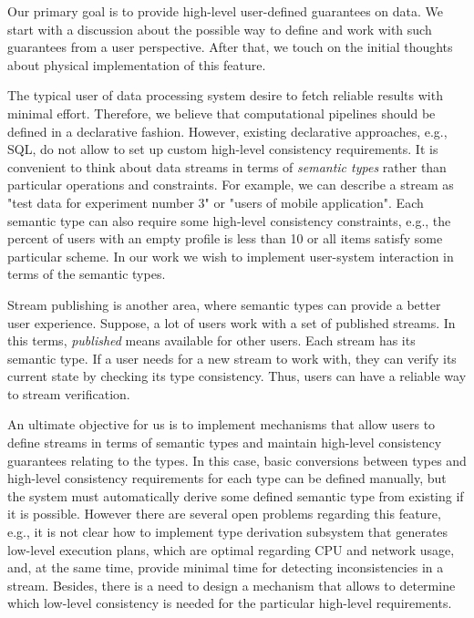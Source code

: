 \label{fs-phd-reliable}

Our primary goal is to provide high-level user-defined guarantees on data. We start with a discussion about the possible way to define and work with such guarantees from a user perspective. After that, we touch on the initial thoughts about physical implementation of this feature.

The typical user of data processing system desire to fetch reliable results with minimal effort. Therefore, we believe that computational pipelines should be defined in a declarative fashion. However, existing declarative approaches, e.g., SQL, do not allow to set up custom high-level consistency requirements. It is convenient to think about data streams in terms of {\em semantic types} rather than particular operations and constraints. For example, we can describe a stream as "test data for experiment number 3" or "users of mobile application". Each semantic type can also require some high-level consistency constraints, e.g., the percent of users with an empty profile is less than 10 or all items satisfy some particular scheme. In our work we wish to implement user-system interaction in terms of the semantic types.

Stream publishing is another area, where semantic types can provide a better user experience. Suppose, a lot of users work with a set of published streams. In this terms, {\em published} means available for other users. Each stream has its semantic type. If a user needs for a new stream to work with, they can verify its current state by checking its type consistency. Thus, users can have a reliable way to stream verification.

An ultimate objective for us is to implement mechanisms that allow users to define streams in terms of semantic types and maintain high-level consistency guarantees relating to the types. In this case, basic conversions between types and high-level consistency requirements for each type can be defined manually, but the system must automatically derive some defined semantic type from existing if it is possible. However there are several open problems regarding this feature, e.g., it is not clear how to implement type derivation subsystem that generates low-level execution plans, which are optimal regarding CPU and network usage, and, at the same time, provide minimal time for detecting inconsistencies in a stream. Besides, there is a need to design a mechanism that allows to determine which low-level consistency is needed for the particular high-level requirements.  

